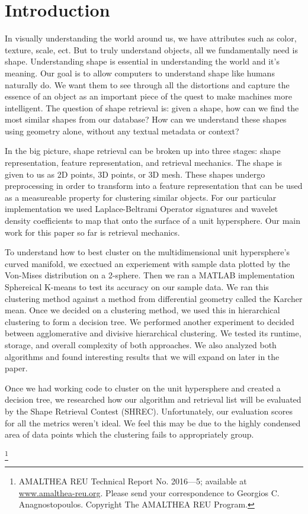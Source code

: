 \documentclass[../tech_report_1.tex]{subfiles}
\newcommand\blfootnote[1]{%
  \begingroup
  \renewcommand\thefootnote{}\footnote{#1}%
  \addtocounter{footnote}{-1}%
  \endgroup
}
\begin{document}
\section{Introduction}


In visually understanding the world around us, we have attributes such as color, texture, scale, ect. But to truly understand objects, all we fundamentally need is shape. Understanding shape is essential in understanding the world and it's meaning. Our goal is to allow computers to understand shape like humans naturally do. We want them to see through all the distortions and capture the essence of an object as an important piece of the quest to make machines more intelligent. The question of shape retrieval is: given a shape, how can we find the most similar shapes from our database? How can we understand these shapes using geometry alone, without any textual metadata or context? 

In the big picture, shape retrieval can be broken up into three stages:
shape representation, feature representation, and retrieval mechanics. The shape is given to us as 2D points, 3D points, or 3D mesh. These shapes undergo preprocessing in order to transform into a feature representation that can be used as a measureable property for clustering similar objects. For our particular implementation we used Laplace-Beltrami Operator signatures and wavelet density coefficients to map that onto the surface of a unit hypersphere. Our main work for this paper so far is retrieval mechanics.

To understand how to best cluster on the multidimensional unit hypersphere's curved manifold, we exectued an experiement with sample data plotted by the Von-Mises distribution on a 2-sphere. Then we ran a MATLAB implementation Sphereical K-means to test its accuracy on our sample data. We ran this clustering method against a method from differential geometry called the Karcher mean. Once we decided on a clustering method, we used this in hierarchical clustering to form a decision tree. We performed another experiment to decided between agglomerative and divisive hierarchical clustering. We tested its runtime, storage, and overall complexity of both approaches. We also analyzed both algorithms and found interesting results that we will expand on later in the paper.

Once we had working code to cluster on the unit hypersphere and
created a decision tree, we researched how our algorithm and retrieval list will be evaluated by the Shape Retrieval Contest (SHREC). Unfortunately, our evaluation scores for all the metrics weren't ideal. We feel this may be due to the highly condensed area of data points which the clustering fails to appropriately group.

\blfootnote{AMALTHEA REU Technical Report No. 2016–--5; available at \href{www.amalthea-reu.org}{www.amalthea-reu.org}. Please send your correspondence to Georgios C. Anagnostopoulos. Copyright \textcopyright \thickspace 2016 The AMALTHEA REU Program.}
\end{document}
